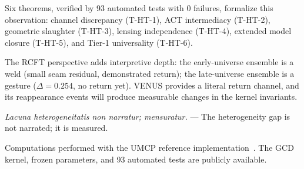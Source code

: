 \documentclass[
  aps,
  prd,
  twocolumn,
  superscriptaddress,
  nofootinbib,
  floatfix
]{revtex4-2}
\newcommand{\hetgap}{\Delta}
\newcommand{\lat}[1]{\textit{#1}}
\begin{document}
Six theorems, verified by 93 automated tests with 0 failures,
formalize this observation:
channel discrepancy (T-HT-1),
ACT intermediacy (T-HT-2),
geometric slaughter (T-HT-3),
lensing independence (T-HT-4),
extended model closure (T-HT-5),
and Tier-1 universality (T-HT-6).

The RCFT perspective adds interpretive depth: the early-universe
ensemble is a weld (small seam residual, demonstrated return);
the late-universe ensemble is a gesture ($\hetgap = 0.254$,
no return yet).
VENUS provides a literal return channel, and its reappearance
events will produce measurable changes in the kernel invariants.

\lat{Lacuna heterogeneitatis non narratur; mensuratur.} ---
The heterogeneity gap is not narrated; it is measured.


\begin{acknowledgments}
Computations performed with the UMCP reference
implementation~\cite{umcpmetadatarepo}.
The GCD kernel, frozen parameters, and 93 automated tests
are publicly available.
\end{acknowledgments}



\end{document}
